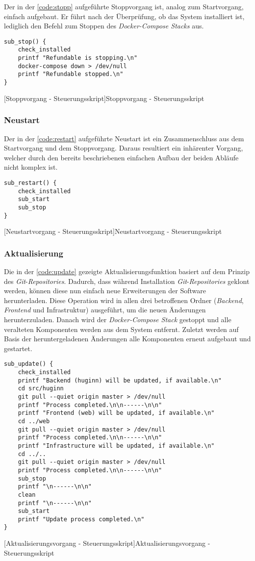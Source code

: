 Der in der \autoref{code:stopp} aufgeführte Stoppvorgang ist, analog zum Startvorgang, einfach aufgebaut. Er führt nach der Überprüfung, ob das System installiert ist, lediglich den Befehl zum Stoppen des \textit{Docker-Compose Stacks} aus.

\begin{verbatim}
sub_stop() {
	check_installed
	printf "Refundable is stopping.\n"
	docker-compose down > /dev/null
	printf "Refundable stopped.\n"
}
\end{verbatim}
[Stoppvorgang - Steuerungsskript]{Stoppvorgang - Steuerungsskript}
\label{code:stopp}

\subsubsection{Neustart}

Der in der \autoref{code:restart} aufgeführte Neustart ist ein Zusammenschluss aus dem Startvorgang und dem Stoppvorgang. Daraus resultiert ein inhärenter Vorgang, welcher durch den bereits beschriebenen einfachen Aufbau der beiden Abläufe nicht komplex ist.

\begin{verbatim}
sub_restart() {
	check_installed
	sub_start
	sub_stop
}
\end{verbatim}
[Neustartvorgang - Steuerungsskript]{Neustartvorgang - Steuerungsskript}
\label{code:restart}

\subsubsection{Aktualisierung}
Die in der \autoref{code:update} gezeigte Aktualisierungsfunktion basiert auf dem Prinzip des \textit{Git}-\textit{Repositories}. Dadurch, dass während Installation \textit{Git}-\textit{Repositories} geklont werden, können diese nun einfach neue Erweiterungen der Software herunterladen. Diese Operation wird in allen drei betroffenen Ordner (\textit{Backend}, \textit{Frontend} und Infrastruktur) ausgeführt, um die neuen Änderungen herunterzuladen. Danach wird der \textit{Docker-Compose Stack} gestoppt und alle veralteten Komponenten werden aus dem System entfernt. Zuletzt werden auf Basis der heruntergeladenen Änderungen alle Komponenten erneut aufgebaut und gestartet.

\newpage

\begin{verbatim}
sub_update() {
	check_installed
	printf "Backend (huginn) will be updated, if available.\n"
	cd src/huginn
	git pull --quiet origin master > /dev/null
	printf "Process completed.\n\n------\n\n"
	printf "Frontend (web) will be updated, if available.\n"
	cd ../web
	git pull --quiet origin master > /dev/null
	printf "Process completed.\n\n------\n\n"
	printf "Infrastructure will be updated, if available.\n"
	cd ../..
	git pull --quiet origin master > /dev/null
	printf "Process completed.\n\n------\n\n"
	sub_stop
	printf "\n------\n\n"
	clean
	printf "\n------\n\n"
	sub_start
	printf "Update process completed.\n"
}
\end{verbatim}
[Aktualisierungsvorgang - Steuerungsskript]{Aktualisierungsvorgang - Steuerungsskript}
\label{code:update}

